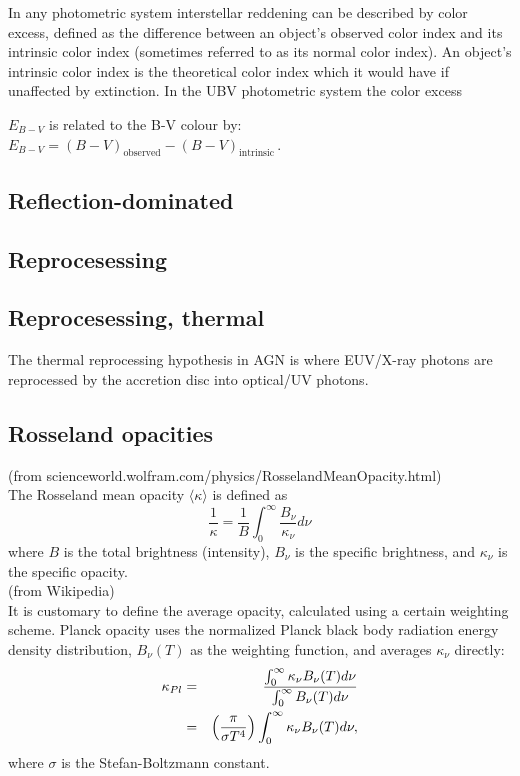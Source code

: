 \documentclass[11pt]{article}
\begin{document}
In any photometric system interstellar reddening can be described by color excess, defined as the difference between an object's observed color index and its intrinsic color index (sometimes referred to as its normal color index). An object's intrinsic color index is the theoretical color index which it would have if unaffected by extinction. In the UBV photometric system the color excess {$E_{B-V}$ is related to the B-V colour by:
$E_{B-V}=(B-V)_{\textrm  {observed}} - (B-V)_{\textrm  {intrinsic}}\,$. 

\subsection*{Reflection-dominated}


\subsection*{Reprocesessing}

\subsection*{Reprocesessing, thermal}
The thermal reprocessing hypothesis in AGN is where EUV/X-ray photons
are reprocessed by the accretion disc into optical/UV photons. 


\subsection*{Rosseland opacities}
(from scienceworld.wolfram.com/physics/RosselandMeanOpacity.html) \\   	
The Rosseland mean opacity $\langle \kappa \rangle$  is defined as
\begin{equation}
\frac{1}{\kappa} = \frac{1}{B} \int^{\infty}_{0} \frac{B_{\nu}}{\kappa_{\nu}} d\nu
\end{equation}
where $B$ is the total brightness (intensity), $B_{\nu}$ is the
specific brightness, and $\kappa_{\nu}$ is the specific opacity. \\

\noindent
(from Wikipedia) \\
It is customary to define the average opacity, calculated using a
certain weighting scheme. Planck opacity uses the normalized Planck
black body radiation energy density distribution, $B_{\nu }(T)$ as the
weighting function, and averages $\kappa _{\nu}$ directly:
\begin{eqnarray}
\kappa _{Pl} & =& {\int _{0}^{\infty }\kappa _{\nu }B_{\nu }(T)d\nu \over
                  \int _{0}^{\infty }B_{\nu }(T)d\nu } \\ 
                 & = &{\Big (}{\pi \over \sigma
                  T^{4}}{\Big )}\int _{0}^{\infty }\kappa _{\nu }B_{\nu }(T)d\nu ,
\end{eqnarray}
\noindent
where $\sigma$ is the Stefan-Boltzmann constant.\\ 

}
\end{document}
